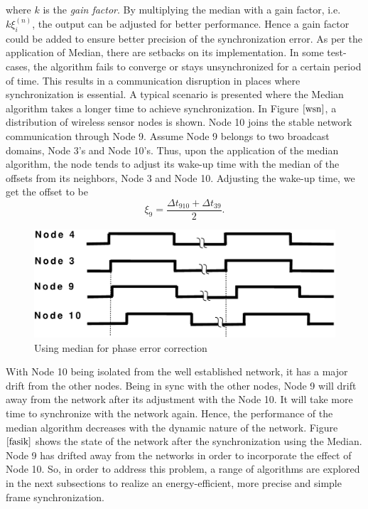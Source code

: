\documentclass[a4paper,10pt]{report}
\begin{document}
where $k$ is the \textit{gain factor}. By multiplying the median with a gain factor,
i.e. $k\xi_i^{(n)}$, the output can be adjusted for better
performance. Hence a gain factor could be added to ensure better
precision of the synchronization error.
\newline As per the application of Median,
there are setbacks on its implementation. In some test-cases, the
algorithm fails to converge or stays unsynchronized for a certain
period of time. This results in a  communication disruption
in places where synchronization is essential.
\newline A typical scenario is presented where the Median
algorithm takes a longer time to achieve synchronization. In Figure
$\ref{wsn}$, a distribution of wireless sensor nodes is shown. Node 10 joins
the stable network communication through Node 9. Assume Node
9 belongs to two broadcast domains, Node 3's and Node 10's. Thus,
upon the application of the median algorithm, the node tends to
adjust its wake-up time with the median of the offsets from its
neighbors, Node 3 and Node 10. Adjusting the wake-up time, we get
the offset to be
\begin{equation}
\xi_9 = \frac{\Delta t_{910} + \Delta t_{39}}{2}.
\end{equation}
\begin{figure}
\centering
\includegraphics[width= 0.75 \textwidth]{offsetpic}
\caption{Using median for phase error correction} \label{fasik}
\end{figure}
\noindent With Node 10 being isolated from the well established
network, it has a major drift from the other nodes. Being in sync
with the other nodes, Node 9 will drift away from the network after
its adjustment with the Node 10. It will take more time to
synchronize with the network again. Hence, the performance of the
median algorithm decreases with the dynamic nature of the network.
Figure $\ref{fasik}$ shows the state of the network after the
synchronization using the Median. Node 9 has drifted away from the
networks in order to incorporate the effect of Node 10.
\newline So, in order to address this problem, a range of
algorithms are explored in the next subsections to realize an
energy-efficient, more precise and simple frame
synchronization.\newline
\end{document}
